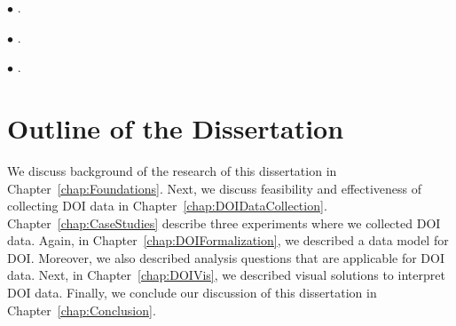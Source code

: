 $\bullet$ .    

$\bullet$ .

$\bullet$ .

\section{Outline of the Dissertation}
We discuss background of the research of this dissertation in Chapter~\ref{chap:Foundations}. Next, we discuss feasibility and effectiveness of collecting DOI data in Chapter~\ref{chap:DOIDataCollection}. Chapter~\ref{chap:CaseStudies} describe three experiments where we collected DOI data. Again, in Chapter~\ref{chap:DOIFormalization}, we described a data model for DOI. Moreover, we also described analysis questions that are applicable for DOI data. Next, in Chapter~\ref{chap:DOIVis}, we described visual solutions to interpret DOI data. Finally, we conclude our discussion of this dissertation in Chapter~\ref{chap:Conclusion}.
